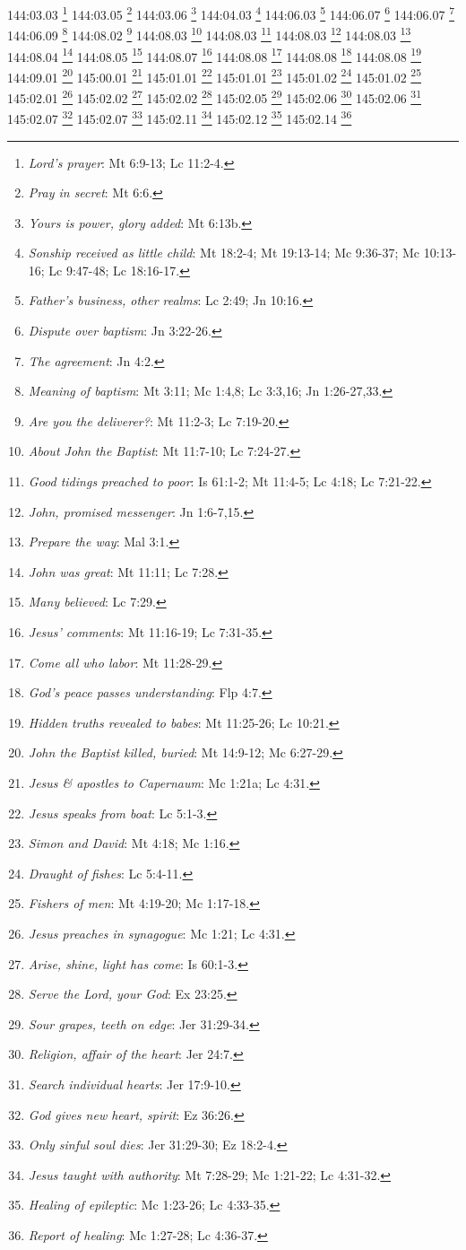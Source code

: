 144:03.03 \footnote{\textit{Lord's prayer}: Mt 6:9-13; Lc 11:2-4.}
144:03.05 \footnote{\textit{Pray in secret}: Mt 6:6.}
144:03.06 \footnote{\textit{Yours is power, glory added}: Mt 6:13b.}
144:04.03 \footnote{\textit{Sonship received as little child}: Mt 18:2-4; Mt 19:13-14; Mc 9:36-37; Mc 10:13-16; Lc 9:47-48; Lc 18:16-17.}
144:06.03 \footnote{\textit{Father's business, other realms}: Lc 2:49; Jn 10:16.}
144:06.07 \footnote{\textit{Dispute over baptism}: Jn 3:22-26.}
144:06.07 \footnote{\textit{The agreement}: Jn 4:2.}
144:06.09 \footnote{\textit{Meaning of baptism}: Mt 3:11; Mc 1:4,8; Lc 3:3,16; Jn 1:26-27,33.}
144:08.02 \footnote{\textit{Are you the deliverer?}: Mt 11:2-3; Lc 7:19-20.}
144:08.03 \footnote{\textit{About John the Baptist}: Mt 11:7-10; Lc 7:24-27.}
144:08.03 \footnote{\textit{Good tidings preached to poor}: Is 61:1-2; Mt 11:4-5; Lc 4:18; Lc 7:21-22.}
144:08.03 \footnote{\textit{John, promised messenger}: Jn 1:6-7,15.}
144:08.03 \footnote{\textit{Prepare the way}: Mal 3:1.}
144:08.04 \footnote{\textit{John was great}: Mt 11:11; Lc 7:28.}
144:08.05 \footnote{\textit{Many believed}: Lc 7:29.}
144:08.07 \footnote{\textit{Jesus' comments}: Mt 11:16-19; Lc 7:31-35.}
144:08.08 \footnote{\textit{Come all who labor}: Mt 11:28-29.}
144:08.08 \footnote{\textit{God's peace passes understanding}: Flp 4:7.}
144:08.08 \footnote{\textit{Hidden truths revealed to babes}: Mt 11:25-26; Lc 10:21.}
144:09.01 \footnote{\textit{John the Baptist killed, buried}: Mt 14:9-12; Mc 6:27-29.}
145:00.01 \footnote{\textit{Jesus & apostles to Capernaum}: Mc 1:21a; Lc 4:31.}
145:01.01 \footnote{\textit{Jesus speaks from boat}: Lc 5:1-3.}
145:01.01 \footnote{\textit{Simon and David}: Mt 4:18; Mc 1:16.}
145:01.02 \footnote{\textit{Draught of fishes}: Lc 5:4-11.}
145:01.02 \footnote{\textit{Fishers of men}: Mt 4:19-20; Mc 1:17-18.}
145:02.01 \footnote{\textit{Jesus preaches in synagogue}: Mc 1:21; Lc 4:31.}
145:02.02 \footnote{\textit{Arise, shine, light has come}: Is 60:1-3.}
145:02.02 \footnote{\textit{Serve the Lord, your God}: Ex 23:25.}
145:02.05 \footnote{\textit{Sour grapes, teeth on edge}: Jer 31:29-34.}
145:02.06 \footnote{\textit{Religion, affair of the heart}: Jer 24:7.}
145:02.06 \footnote{\textit{Search individual hearts}: Jer 17:9-10.}
145:02.07 \footnote{\textit{God gives new heart, spirit}: Ez 36:26.}
145:02.07 \footnote{\textit{Only sinful soul dies}: Jer 31:29-30; Ez 18:2-4.}
145:02.11 \footnote{\textit{Jesus taught with authority}: Mt 7:28-29; Mc 1:21-22; Lc 4:31-32.}
145:02.12 \footnote{\textit{Healing of epileptic}: Mc 1:23-26; Lc 4:33-35.}
145:02.14 \footnote{\textit{Report of healing}: Mc 1:27-28; Lc 4:36-37.}
